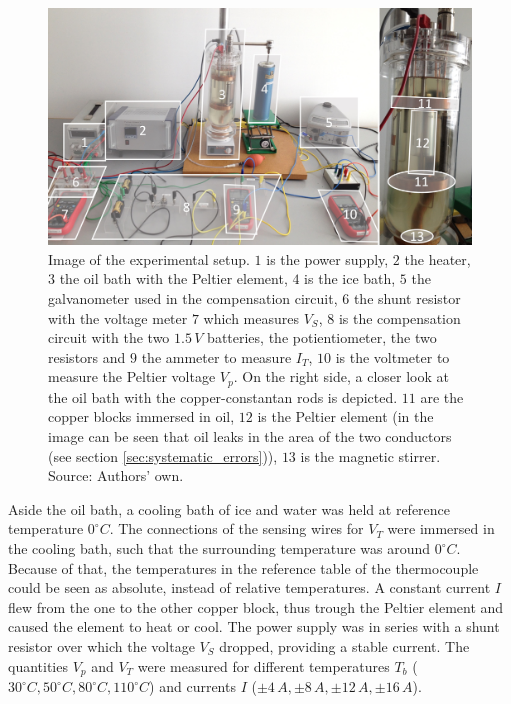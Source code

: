 \documentclass[a4paper]{article}
\begin{document}
\begin{figure}[H]
\captionsetup{singlelinecheck=off}
\centering
\includegraphics[width=1.0\textwidth]{img/setup.jpg}
\caption[blubb]{Image of the experimental setup. $1$ is the power supply, $2$ the heater, $3$ the oil bath with the Peltier element, $4$ is the ice bath, $5$ the galvanometer used in the compensation circuit, $6$ the shunt resistor with the voltage meter $7$ which measures $V_S$, $8$ is the compensation circuit with the two $1.5 \, V$ batteries, the potientiometer, the two resistors and $9$ the ammeter to measure $I_T$, $10$ is the voltmeter to measure the Peltier voltage $V_p$. On the right side, a closer look at the oil bath with the copper-constantan rods is depicted. $11$ are the copper blocks immersed in oil, $12$ is the Peltier element (in the image can be seen that oil leaks in the area of the two conductors (see section \ref{sec:systematic_errors})), $13$ is the magnetic stirrer. Source: Authors' own.}
\label{fig:setup}
\end{figure}

Aside the oil bath, a cooling bath of ice and water was held at reference temperature $0^{\circ}C$. The connections of the sensing wires for $V_T$ were immersed in the cooling bath, such that the surrounding temperature was around $0^{\circ}C$. Because of that, the temperatures in the reference table \cite{thermocouple} of the thermocouple could be seen as absolute, instead of relative temperatures.
\newline
A constant current $I$ flew from the one to the other copper block, thus trough the Peltier element and caused the element to heat or cool. The power supply was in series with a shunt resistor over which the voltage $V_S$ dropped, providing a stable current.
\newline
The quantities $V_p$ and $V_T$ were measured for different temperatures $T_b$ ($30^{\circ}C, 50^{\circ}C, 80^{\circ}C, 110^{\circ}C$) and currents $I$ ($\pm 4 \, A, \pm 8 \, A, \pm 12 \, A, \pm 16 \, A$).
\end{document}
